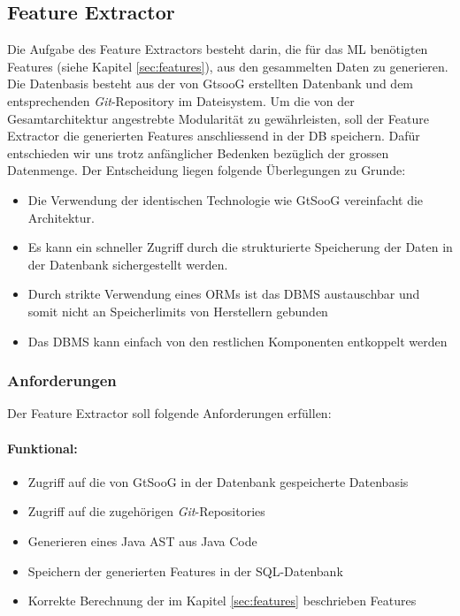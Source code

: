 \documentclass[10pt, a4paper]{article}
\begin{document}
\subsection{Feature Extractor} \label{sec:featureextractor}
Die Aufgabe des Feature Extractors besteht darin, die für das \ac{ML} benötigten Features (siehe Kapitel \ref{sec:features}), aus den gesammelten Daten zu generieren. Die Datenbasis besteht aus der von GtsooG erstellten Datenbank und dem entsprechenden \emph{Git}-Repository im Dateisystem. Um die von der Gesamtarchitektur angestrebte Modularität zu gewährleisten, soll der Feature Extractor die generierten Features anschliessend in der \ac{DB} speichern. Dafür entschieden wir uns trotz anfänglicher Bedenken bezüglich der grossen Datenmenge. Der Entscheidung liegen folgende Überlegungen zu Grunde:
\begin{itemize}
	\item Die Verwendung der identischen Technologie wie GtSooG vereinfacht die Architektur.
	\item Es kann ein schneller Zugriff durch die strukturierte Speicherung der Daten in der Datenbank sichergestellt werden.
	\item Durch strikte Verwendung eines \acp{ORM} ist das \ac{DBMS} austauschbar und somit nicht an Speicherlimits von Herstellern gebunden
	\item Das \ac{DBMS} kann einfach von den restlichen Komponenten entkoppelt werden
\end{itemize}

 \subsubsection{Anforderungen}
Der Feature Extractor soll folgende Anforderungen erfüllen:

\paragraph{Funktional:}
\begin{itemize}
	\item Zugriff auf die von GtSooG in der Datenbank gespeicherte Datenbasis
	\item Zugriff auf die zugehörigen \emph{Git}-Repositories
	\item Generieren eines Java \ac{AST} aus Java Code
	\item Speichern der generierten Features in der SQL-Datenbank
	\item Korrekte Berechnung der im Kapitel \ref{sec:features} beschrieben Features
\end{itemize} 
\end{document}

